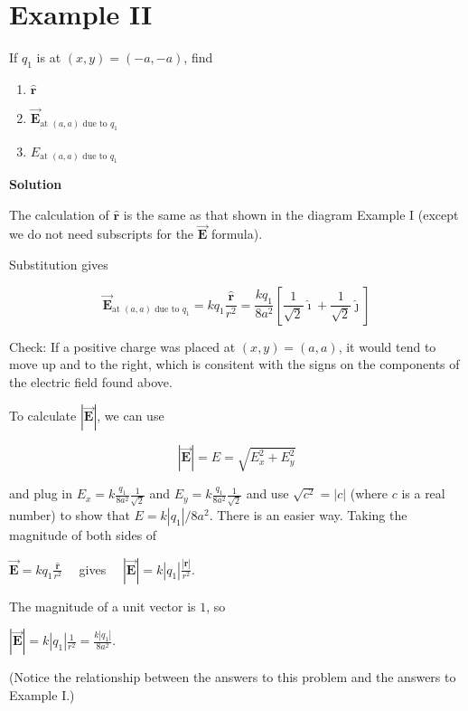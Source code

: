 \documentclass{article}
\newcommand{\ds}[0]{\displaystyle}
\newcommand{\ihat}[0]{\hat{\boldsymbol{\imath}}}
\newcommand{\jhat}[0]{\hat{\boldsymbol{\jmath}}}
\newcommand{\rhat}[0]{\hat{\mathbf{r}}}
\newcommand{\bfvec}[1]{\vec{\mathbf{#1}}}
\begin{document}

\fi

\newpage

\section{Example II}

If $q_1$ is at $(x,y)=(-a,-a)$, find

\begin{enumerate}

  \item $\rhat$

  \item $\bfvec{E}_{\text{at }(a,a)\text{ due to }q_1}$

  \item $E_{\text{at }(a,a)\text{ due to }q_1}$

\end{enumerate}

\textbf{Solution}

The calculation of $\rhat$ is the same as that shown in the diagram Example I (except we do not need subscripts for the $\bfvec{E}$ formula).

Substitution gives

$$\bfvec{E}_{\text{at }(a,a)\text{ due to }q_1}=kq_1\frac{\rhat}{r^2} =\frac{kq_1}{8a^2}\left[\frac{1}{\sqrt{2}}\ihat + \frac{1}{\sqrt{2}}\jhat\right]$$

Check: If a positive charge was placed at $(x,y)=(a,a)$, it would tend to move up and to the right, which is consitent with the signs on the components of the electric field found above.

To calculate $|\bfvec{E}|$, we can use

$$|\bfvec{E}|=E=\sqrt{E_x^2+E_y^2}$$

and plug in $E_x=k\frac{q_1}{8a^2}\frac{1}{\sqrt{2}}$ and $E_y=k\frac{q_1}{8a^2}\frac{1}{\sqrt{2}}$ and use $\sqrt{c^2}=|c|$ (where $c$ is a real number) to show that $E=k|q_1|/{8a^2}$. There is an easier way. Taking the magnitude of both sides of

$\ds\bfvec{E}=kq_1\frac{\rhat}{r^2}\quad$
gives
$\quad\ds|\bfvec{E}|=k|q_1|\frac{|\rhat|}{r^2}$.

The magnitude of a unit vector is $1$, so

$\ds|\bfvec{E}|=k|q_1|\frac{1}{r^2}=\frac{k|q_1|}{8a^2}$.

(Notice the relationship between the answers to this problem and the answers to Example I.)
\end{document}
